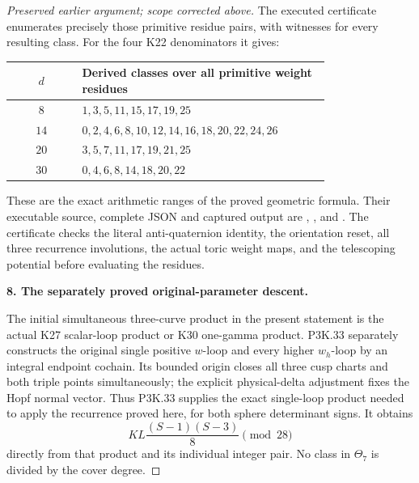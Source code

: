 \begin{proof}[Preserved earlier argument; scope corrected above]
The executed certificate enumerates precisely those
primitive residue pairs, with witnesses for every
resulting class. For the four K22 denominators it gives:

\begin{center}\begin{tabular}{c p{0.78\linewidth}}\toprule
\(d\) & Derived classes over all primitive weight residues\\
\midrule
\(8\) & \(1,3,5,11,15,17,19,25\)\\
\(14\) & \(0,2,4,6,8,10,12,14,16,18,20,22,24,26\)\\
\(20\) & \(3,5,7,11,17,19,21,25\)\\
\(30\) & \(0,4,6,8,14,18,20,22\)\\
\bottomrule\end{tabular}\end{center}

These are the exact arithmetic ranges of the proved
geometric formula. Their executable
source, complete JSON and captured output are
,
,
and .
The certificate checks the literal anti-quaternion
identity, the orientation reset, all three recurrence
involutions, the actual toric weight maps, and the
telescoping potential before evaluating the residues.

\par\medskip\noindent\textbf{8. The separately proved original-parameter descent.}\enspace

The initial simultaneous three-curve product in the present
statement is the actual K27 scalar-loop product or K30
one-gamma product. P3K.33 separately constructs the original
single positive \(w\)-loop and every higher \(w_h\)-loop
by an integral endpoint cochain. Its bounded origin closes
all three cusp charts and both triple points simultaneously;
the explicit physical-delta adjustment fixes the Hopf normal
vector. Thus P3K.33 supplies the exact single-loop product
needed to apply the recurrence proved here, for both sphere
determinant signs. It obtains
\[
             KL\frac{(S-1)(S-3)}8\pmod{28}
\]
directly from that product and its individual integer pair.
No class in \(\Theta_7\) is divided by the cover degree.
\end{proof}

